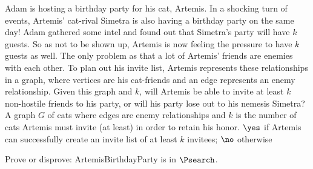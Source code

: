 \documentclass[11pt]{article}
\begin{document}
\begin{enumerate}
    Adam is hosting a birthday party for his cat, Artemis. In a shocking turn of events, Artemis' cat-rival Simetra is also having a birthday party on the same day! Adam gathered some intel and found out that Simetra’s party will have $k$ guests. So as not to be shown up, Artemis is now feeling the pressure to have $k$ guests as well. The only problem as that a lot of Artemis’ friends are enemies with each other. To plan out his invite list, Artemis represents these relationships in a graph, where vertices are his cat-friends and an edge represents an enemy relationship. Given this graph and $k$, will Artemis be able to invite at least $k$ non-hostile friends to his party, or will his party lose out to his nemesis Simetra?
    {A graph $G$ of cats where edges are enemy relationships and $k$ is the number of cats Artemis must invite (at least) in order to retain his honor.}
    {$\yes$ if Artemis can successfully create an invite list of at least $k$ invitees; $\no$ otherwise}

    Prove or disprove: ArtemisBirthdayParty is in $\Psearch$.



\end{enumerate}
\end{document}
